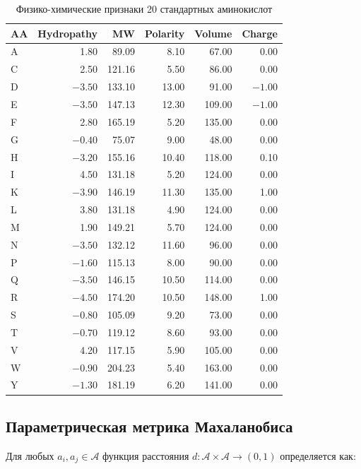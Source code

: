 \documentclass[12pt]{article}
\begin{document}
\begin{table}[h]
\centering
\caption{Физико-химические признаки 20 стандартных аминокислот}
\label{tab:features}
\begin{tabular}{lrrrrr}
\toprule
\textbf{AA} & \textbf{Hydropathy} & \textbf{MW} & \textbf{Polarity} & \textbf{Volume} & \textbf{Charge} \\
\midrule
A & 1.80 & 89.09 & 8.10 & 67.00 & 0.00 \\
C & 2.50 & 121.16 & 5.50 & 86.00 & 0.00 \\
D & $-3.50$ & 133.10 & 13.00 & 91.00 & $-1.00$ \\
E & $-3.50$ & 147.13 & 12.30 & 109.00 & $-1.00$ \\
F & 2.80 & 165.19 & 5.20 & 135.00 & 0.00 \\
G & $-0.40$ & 75.07 & 9.00 & 48.00 & 0.00 \\
H & $-3.20$ & 155.16 & 10.40 & 118.00 & 0.10 \\
I & 4.50 & 131.18 & 5.20 & 124.00 & 0.00 \\
K & $-3.90$ & 146.19 & 11.30 & 135.00 & 1.00 \\
L & 3.80 & 131.18 & 4.90 & 124.00 & 0.00 \\
M & 1.90 & 149.21 & 5.70 & 124.00 & 0.00 \\
N & $-3.50$ & 132.12 & 11.60 & 96.00 & 0.00 \\
P & $-1.60$ & 115.13 & 8.00 & 90.00 & 0.00 \\
Q & $-3.50$ & 146.15 & 10.50 & 114.00 & 0.00 \\
R & $-4.50$ & 174.20 & 10.50 & 148.00 & 1.00 \\
S & $-0.80$ & 105.09 & 9.20 & 73.00 & 0.00 \\
T & $-0.70$ & 119.12 & 8.60 & 93.00 & 0.00 \\
V & 4.20 & 117.15 & 5.90 & 105.00 & 0.00 \\
W & $-0.90$ & 204.23 & 5.40 & 163.00 & 0.00 \\
Y & $-1.30$ & 181.19 & 6.20 & 141.00 & 0.00 \\
\bottomrule
\end{tabular}
\end{table}

\subsection{Параметрическая метрика Махаланобиса}

Для любых $a_i, a_j \in \mathcal{A}$ функция расстояния $d: \mathcal{A} \times \mathcal{A} \to (0, 1)$ определяется как:
\end{document}
